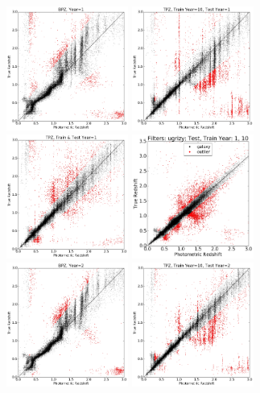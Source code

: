 \documentclass[DM,lsstdraft,toc]{lsstdoc}
\begin{document}
\begin{figure}
\begin{center}
\includegraphics[width=4.0cm]{figures/BPZ_Euclid_Y1_tzpz.png}
\includegraphics[width=4.0cm]{figures/TPZ_Euclid_10Y1_tzpz.png}
\includegraphics[width=4.0cm]{figures/TPZ_Euclid_1Y1_tzpz.png}
\includegraphics[width=4.0cm]{figures/CM_10Y1_tzpz.png}
\includegraphics[width=4.0cm]{figures/BPZ_Euclid_Y2_tzpz.png}
\includegraphics[width=4.0cm]{figures/TPZ_Euclid_10Y2_tzpz.png}

\end{center}
\end{figure}
\end{document}
